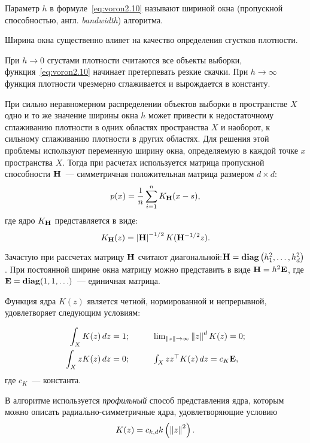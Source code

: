 Параметр \( h \) в формуле~\eqref{eq:voron2.10} называют шириной окна (пропускной способностью, англ. \emph{bandwidth}) алгоритма.

Ширина окна существенно влияет на качество определения сгустков плотности.

При \( h\to 0 \) сгустами плотности считаются все объекты выборки, функция~\eqref{eq:voron2.10} начинает претерпевать резкие скачки. При \( h\to\infty \) функция плотности чрезмерно сглаживается и вырождается в константу.

При сильно неравномерном распределении объектов выборки в пространстве \( X \) одно и то же значение ширины окна \( h \) может привести к недостаточному сглаживанию плотности в одних областях пространства \( X \) и наоборот, к сильному сглаживанию плотности в других областях. Для решения этой проблемы используют переменную ширину окна, определяемую в каждой точке \( x \) пространства \( X \). Тогда при расчетах используется матрица пропускной способности \( \mathbf{H} \)~--- симметричная положительная матрица размером \( d\times d\):
\begin{equation}
    p(x) = \frac{1}{n}\sum_{i=1}^n K_{\mathbf{H}}(x - s),
    \label{eq:msrobust1}
\end{equation}
где ядро \( K_{\mathbf{H}} \) представляется в виде:
\[
    K_{\mathbf{H}}(z) = \left|\mathbf{H}\right|^{-1/2} K(\mathbf{H}^{-1/2}z).
\]

Зачастую при рассчетах матрицу \( \mathbf{H} \) считают диагональной:\linebreak \( \mathbf{H} = \mathbf{diag}\left(h_1^2, \ldots, h_d^2\right) \). При постоянной ширине окна матрицу можно представить в виде \( \mathbf{H} = h^2\mathbf{E} \), где \( \mathbf{E} = \mathbf{diag}(1, 1, \ldots) \)~--- единичная матрица.

Функция ядра \( K(z) \) является четной, нормированной и непрерывной, удовлетворяет следующим условиям:

\[
    \begin{array}{rl}
    \displaystyle \int_X K(z)\,dz = 1; \qquad &
    \lim_{\left\|z\right\|\to\infty} \left\|z\right\|^d K(z) = 0; \\[1em]
    \displaystyle \int_X zK(z)\,dz = 0; \qquad &
    \int_X zz^\top K(z)\,dz = c_K\mathbf{E},
    \end{array}
\]
где \( c_K \)~--- константа.

В алгоритме используется \emph{профильный} способ представления ядра, которым можно описать радиально-симметричные ядра, удовлетворяющие условию
\[
    K(z) = c_{k, d} k\left(\left\|z\right\|^2\right).
\]

